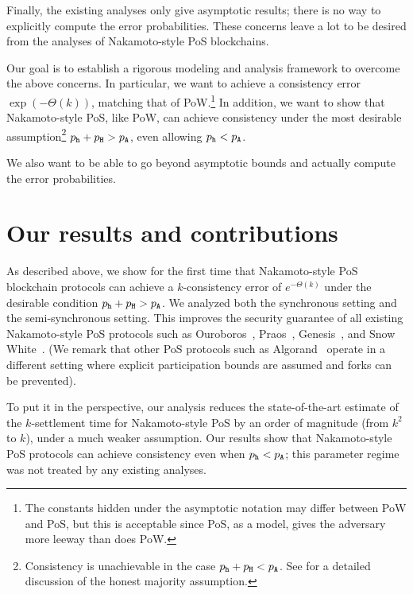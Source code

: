 Finally, the existing analyses only give asymptotic results; 
there is no way to explicitly compute the error probabilities.
These concerns leave a lot to be desired from 
the analyses of Nakamoto-style PoS blockchains.



Our goal is to establish a rigorous modeling and analysis 
framework to overcome the above concerns. 
In particular, 
we want to achieve a consistency error $\exp(-\Theta(k))$, 
matching that of PoW.\footnote{
  The constants hidden under the asymptotic notation may differ between PoW and PoS, 
  but this is acceptable since 
  PoS, as a model, gives the adversary more leeway than does PoW.
} 
In addition, 
we want to show that Nakamoto-style PoS, like PoW, 
can achieve consistency
under the most desirable assumption\footnote{ 
  Consistency is unachievable in the case $p_{\mathtt{h}} + p_{\mathtt{H}} < p_{\mathtt{A}}$.
  See \cite{GK18} for a detailed discussion of the honest majority
  assumption. 
} $p_{\mathtt{h}} + p_{\mathtt{H}} > p_{\mathtt{A}}$, even allowing $p_{\mathtt{h}} < p_{\mathtt{A}}$. 

We also want to be able to go beyond asymptotic bounds 
and actually compute the error probabilities.








\section{Our results and contributions} 
As described above, we show for the first time that Nakamoto-style PoS blockchain
protocols can achieve a $k$-consistency error
of $e^{-\Theta(k)}$ under the desirable condition
$p_{\mathtt{h}} + p_{\mathtt{H}} > p_{\mathtt{A}}$. 
We analyzed both the synchronous setting and the semi-synchronous setting.
This improves the security guarantee of all existing 
Nakamoto-style PoS protocols such as Ouroboros~\cite{Ouroboros}, Praos~\cite{Praos},
Genesis~\cite{Genesis}, and Snow White~\cite{SnowWhite}.
(We remark that other PoS protocols such as Algorand~\cite{Algorand} 
operate in a different setting where explicit participation bounds are assumed
and forks can be prevented). 

To put it in the perspective, 
our analysis reduces the state-of-the-art estimate 
of the $k$-settlement time for Nakamoto-style PoS 
by an order of magnitude (from $k^2$ to $k$), 
under a much weaker assumption.
Our results show that Nakamoto-style PoS protocols can achieve
consistency even when $p_{\mathtt{h}} < p_{\mathtt{A}}$; 
this parameter regime was not treated by any existing analyses. 

